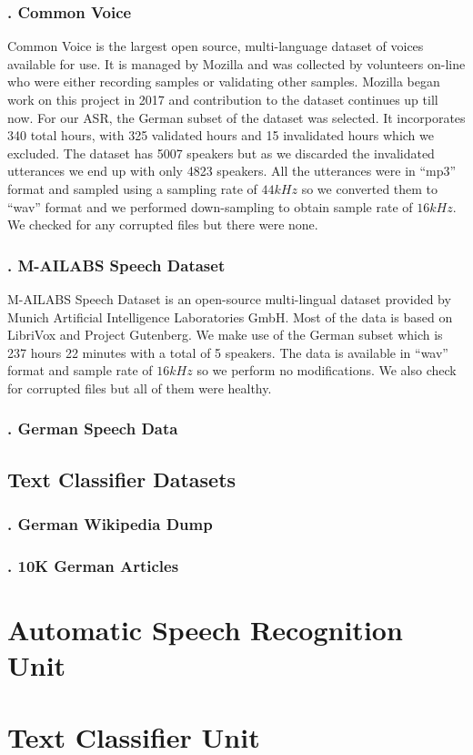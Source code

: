 \subsubsection{. Common Voice}
\label{meth:subsubsub1}

Common Voice is the largest open source, multi-language dataset of voices available for use. It is managed by Mozilla and was collected by volunteers on-line who were either recording samples or validating other samples. Mozilla began work on this project in 2017 and contribution to the dataset continues up till now. 
For our \ac{ASR}, the German subset of the dataset was selected. It incorporates 340 total hours, with 325 validated hours and 15 invalidated hours which we excluded. The dataset has 5007 speakers but as we discarded the invalidated utterances we end up with only 4823 speakers. 
All the utterances were in \enquote{mp3} format and sampled using a sampling rate of $44 kHz$ so we converted them to \enquote{wav} format and we performed down-sampling to obtain sample rate of $16 kHz$. We checked for any corrupted files but there were none.


\subsubsection{. M-AILABS Speech Dataset}
\label{meth:subsub2}
M-AILABS Speech Dataset is an open-source multi-lingual dataset provided by Munich Artificial Intelligence Laboratories GmbH. Most of the data is based on LibriVox and Project Gutenberg. We make use of the German subset which is 237 hours 22 minutes with a total of 5 speakers. The data is available in \enquote{wav} format and sample rate of $16 kHz$ so we perform no modifications. We also check for corrupted files but all of them were healthy.

\subsubsection{. German Speech Data \cite{radeck2015open}}
\label{meth:subsub3}



\subsection{Text Classifier Datasets}
\label{meth:sub2}

\subsubsection{. German Wikipedia Dump}
\label{meth:subsub4}
\subsubsection{. 10K German Articles}
\label{meth:subsub5}


\section{Automatic Speech Recognition Unit} 
\label{meth:s3}

\section{Text Classifier Unit} 
\label{meth:s4}
